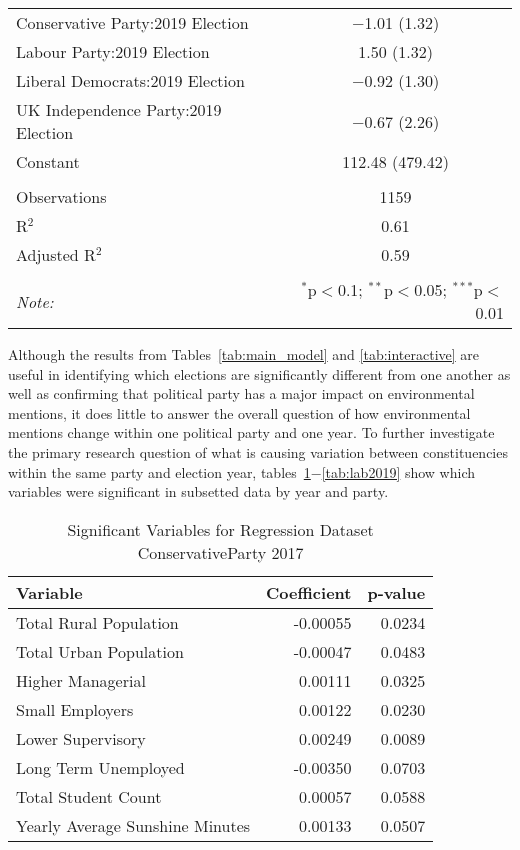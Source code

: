 \documentclass[12pt,letterpaper]{article}
\begin{document}
\begin{table}[H]
\begin{tabular}{@{\extracolsep{5pt}}lc}
		Conservative Party:2019 Election & $-$1.01 (1.32) \\ 
		Labour Party:2019 Election & 1.50 (1.32) \\ 
		Liberal Democrats:2019 Election & $-$0.92 (1.30) \\ 
		UK Independence Party:2019 Election & $-$0.67 (2.26) \\ 
		Constant & 112.48 (479.42) \\ 
		\hline \\[-1.8ex] 
		Observations & 1159 \\ 
		R$^{2}$ & 0.61 \\ 
		Adjusted R$^{2}$ & 0.59 \\ 
		\hline 
		\hline \\[-1.8ex] 
		\textit{Note:}  & \multicolumn{1}{r}{$^{*}$p$<$0.1; $^{**}$p$<$0.05; $^{***}$p$<$0.01} \\ 
	\end{tabular} 
\end{table} 


\newpage

\pagestyle{plain}

Although the results from Tables~\ref{tab:main_model} and \ref{tab:interactive} are useful in identifying which elections are significantly different from one another as well as confirming that political party has a major impact on environmental mentions, it does little to answer the overall question of how environmental mentions change within one political party and one year. To further investigate the primary research question of what is causing variation between constituencies within the same party and election year, tables~\ref{tab:cons2017}$-$\ref{tab:lab2019} show which variables were significant in subsetted data by year and party.

\begin{table}[h!]
	\caption{Significant Variables for Regression Dataset ConservativeParty 2017}
	\label{tab:cons2017}
	\centering
	\begin{tabular}{|l|r|r|}
		\hline
		\textbf{Variable} & \textbf{Coefficient} & \textbf{p-value} \\
		\hline
		Total Rural Population & -0.00055 & 0.0234 \\
		Total Urban Population & -0.00047 & 0.0483 \\
		Higher Managerial & 0.00111 & 0.0325 \\
		Small Employers & 0.00122 & 0.0230 \\
		Lower Supervisory & 0.00249 & 0.0089 \\
		Long Term Unemployed & -0.00350 & 0.0703 \\
		Total Student Count & 0.00057 & 0.0588 \\
		Yearly Average Sunshine Minutes & 0.00133 & 0.0507 \\
		\hline
	\end{tabular}
\end{table}
\end{document}
